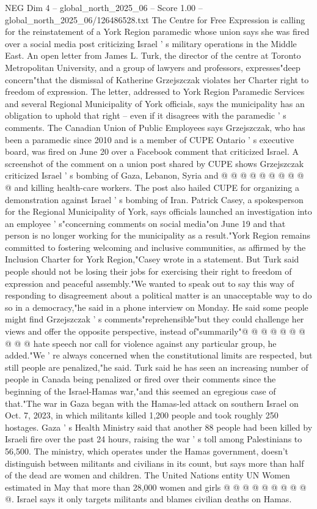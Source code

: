 \begin{textsample}{NEG Dim 4 – global\_north\_2025\_06 – Score 1.00 – global\_north\_2025\_06/126486528.txt}  \label{ex:f4_neg_079}
The Centre for Free Expression is calling for the reinstatement of a York Region paramedic whose union says she was fired over a social media post criticizing Israel ' s military operations in the Middle East.
An open letter from James L.
Turk, the director of the centre at Toronto Metropolitan University, and a group of lawyers and professors, expresses"deep concern"that the dismissal of Katherine Grzejszczak violates her Charter right to freedom of expression.
The letter, addressed to York Region Paramedic Services and several Regional Municipality of York officials, says the municipality has an obligation to uphold that right -- even if it disagrees with the paramedic ' s comments.
The Canadian Union of Public Employees says Grzejszczak, who has been a paramedic since 2010 and is a member of CUPE Ontario ' s executive board, was fired on June 20 over a Facebook comment that criticized Israel.
A screenshot of the comment on a union post shared by CUPE shows Grzejszczak criticized Israel ' s bombing of Gaza, Lebanon, Syria and @ @ @ @ @ @ @ @ @ @ and killing health-care workers.
The post also hailed CUPE for organizing a demonstration against Israel ' s bombing of Iran.
Patrick Casey, a spokesperson for the Regional Municipality of York, says officials launched an investigation into an employee ' s"concerning comments on social media"on June 19 and that person is no longer working for the municipality as a result."York Region remains committed to fostering welcoming and inclusive communities, as affirmed by the Inclusion Charter for York Region,"Casey wrote in a statement.
But Turk said people should not be losing their jobs for exercising their right to freedom of expression and peaceful assembly."We wanted to speak out to say this way of responding to disagreement about a political matter is an unacceptable way to do so in a democracy,"he said in a phone interview on Monday.
He said some people might find Grzejszczak ' s comments"reprehensible"but they could challenge her views and offer the opposite perspective, instead of"summarily"@ @ @ @ @ @ @ @ @ @ hate speech nor call for violence against any particular group, he added."We ' re always concerned when the constitutional limits are respected, but still people are penalized,"he said.
Turk said he has seen an increasing number of people in Canada being penalized or fired over their comments since the beginning of the Israel-Hamas war,"and this seemed an egregious case of that."The war in Gaza began with the Hamas-led attack on southern Israel on Oct. 7, 2023, in which militants killed 1,200 people and took roughly 250 hostages.
Gaza ' s Health Ministry said that another 88 people had been killed by Israeli fire over the past 24 hours, raising the war ' s toll among Palestinians to 56,500.
The ministry, which operates under the Hamas government, doesn't distinguish between militants and civilians in its count, but says more than half of the dead are women and children.
The United Nations entity UN Women estimated in May that more than 28,000 women and girls @ @ @ @ @ @ @ @ @ @.
Israel says it only targets militants and blames civilian deaths on Hamas.

\end{textsample}
